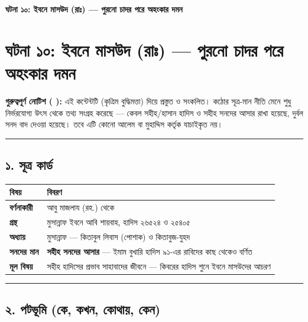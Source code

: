 

\begin{center}{\Large\bfseries\color{emerald} ঘটনা ১০: ইবনে মাসউদ (রাঃ) — পুরনো চাদর পরে অহংকার দমন}\end{center}
\vspace{1em}
\section*{ঘটনা ১০: ইবনে মাসউদ (রাঃ) — পুরনো চাদর পরে অহংকার দমন}

\begin{warnbox}
 \textbf{গুরুত্বপূর্ণ নোটিশ ( ):} এই কন্টেন্টটি  (কৃত্রিম বুদ্ধিমত্তা) দিয়ে প্রস্তুত ও সংকলিত।  কঠোর সূত্র-মান নীতি মেনে শুধু নির্ভরযোগ্য উৎস থেকে তথ্য সংগ্রহ করেছে — কেবল সহীহ/হাসান হাদিস ও সহীহ সনদের আসার রাখা হয়েছে, দুর্বল সনদ বাদ দেওয়া হয়েছে। তবে এটি কোনো আলেম বা মুহাদ্দিস কর্তৃক যাচাইকৃত নয়।
\end{warnbox}


\medskip\hrule\medskip

\subsection*{১. সূত্র কার্ড}

\begin{table}[h]\centering\small
\begin{tabular}{ll}
বিষয় & বিবরণ \\
\hline
\textbf{বর্ণনাকারী} & আবু মাজলায (রহ.) থেকে \\
\textbf{গ্রন্থ} & মুসান্নাফ ইবনে আবি শায়বাহ, হাদিস ২৬৫২৪ ও ২৫৪০৫ \\
\textbf{অধ্যায়} & মুসান্নাফ — কিতাবুল লিবাস (পোশাক) ও কিতাবুজ-যুহদ \\
\textbf{সনদের মান} & \textbf{সহীহ সনদের আসার} — ইমাম বুখারি হাদিস ৯১-এর রাবিদের কাছ থেকেও বর্ণিত \\
\textbf{মূল বিষয়} & সহীহ হাদিসের প্রভাব সাহাবাদের জীবনে — কিবরের হাদিস শুনে ইবনে মাসউদের আচরণ \\
\hline
\end{tabular}
\end{table}

\medskip\hrule\medskip

\subsection*{২. পটভূমি (কে, কখন, কোথায়, কেন)}

